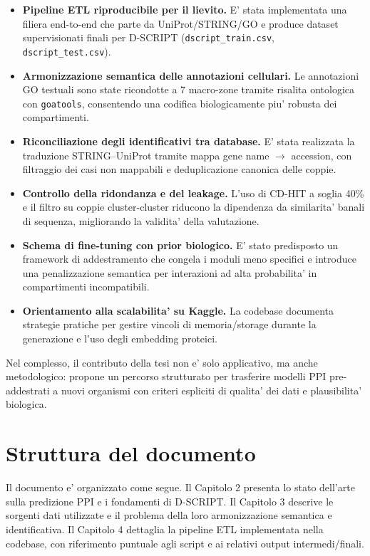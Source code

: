 \documentclass[12pt,a4paper,oneside]{report} %
\begin{document}
\begin{itemize}
    \item \textbf{Pipeline ETL riproducibile per il lievito.} E' stata implementata una filiera end-to-end che parte da UniProt/STRING/GO e produce dataset supervisionati finali per D-SCRIPT (\texttt{dscript\_train.csv}, \texttt{dscript\_test.csv}).
    \item \textbf{Armonizzazione semantica delle annotazioni cellulari.} Le annotazioni GO testuali sono state ricondotte a 7 macro-zone tramite risalita ontologica con \texttt{goatools}, consentendo una codifica biologicamente piu' robusta dei compartimenti.
    \item \textbf{Riconciliazione degli identificativi tra database.} E' stata realizzata la traduzione STRING--UniProt tramite mappa gene name $\rightarrow$ accession, con filtraggio dei casi non mappabili e deduplicazione canonica delle coppie.
    \item \textbf{Controllo della ridondanza e del leakage.} L'uso di CD-HIT a soglia 40\% e il filtro su coppie cluster-cluster riducono la dipendenza da similarita' banali di sequenza, migliorando la validita' della valutazione.
    \item \textbf{Schema di fine-tuning con prior biologico.} E' stato predisposto un framework di addestramento che congela i moduli meno specifici e introduce una penalizzazione semantica per interazioni ad alta probabilita' in compartimenti incompatibili.
    \item \textbf{Orientamento alla scalabilita' su Kaggle.} La codebase documenta strategie pratiche per gestire vincoli di memoria/storage durante la generazione e l'uso degli embedding proteici.
\end{itemize}

Nel complesso, il contributo della tesi non e' solo applicativo, ma anche metodologico: propone un percorso strutturato per trasferire modelli PPI pre-addestrati a nuovi organismi con criteri espliciti di qualita' dei dati e plausibilita' biologica.
\section{Struttura del documento}
Il documento e' organizzato come segue. Il Capitolo 2 presenta lo stato dell'arte sulla predizione PPI e i fondamenti di D-SCRIPT. Il Capitolo 3 descrive le sorgenti dati utilizzate e il problema della loro armonizzazione semantica e identificativa. Il Capitolo 4 dettaglia la pipeline ETL implementata nella codebase, con riferimento puntuale agli script e ai relativi output intermedi/finali.
\end{document}
